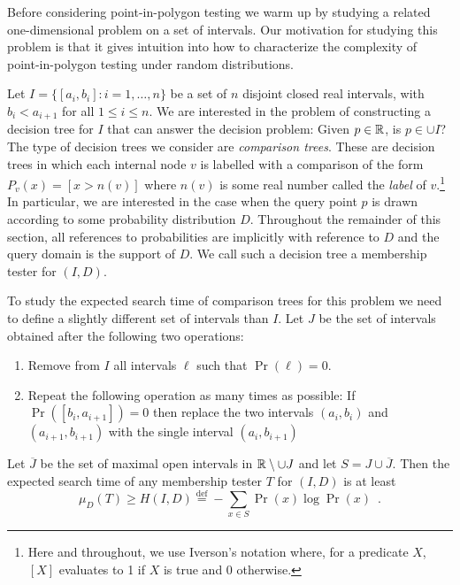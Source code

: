 \documentclass[charterfonts,lotsofwhite]{patmorin}
\newcommand{\defequals}{\stackrel{\mathrm{def}}{=}}
\begin{document}
Before considering point-in-polygon testing we warm up by studying a
related one-dimensional problem on a set of intervals.  Our motivation
for studying this problem is that it gives intuition into how to
characterize the complexity of point-in-polygon testing under random
distributions.

Let $I=\{[a_i,b_i]: i=1,\ldots,n\}$ be a set of $n$ disjoint closed
real intervals, with $b_i < a_{i+1}$ for all $1\le i\le n$.  We are
interested in the problem of constructing a decision tree for $I$ that
can answer the decision problem: Given $p\in\mathbb{R}$, is $p\in \cup I$?
The type of decision trees we consider are \emph{comparison trees}.
These are decision trees in which each internal node $v$ is labelled
with a comparison of the form $P_v(x) = [x > n(v)]$ where $n(v)$ is
some real number called the \emph{label} of $v$.\footnote{Here and
throughout, we use Iverson's notation \cite{kXX} where, for a
predicate $X$, $[X]$ evaluates to 1 if $X$ is true and 0 otherwise.}
In particular, we are interested in the case when the query point $p$
is drawn according to some probability distribution $D$.   Throughout
the remainder of this section, all references to probabilities are
implicitly with reference to $D$ and the query domain is the support
of $D$.  We call such a decision tree a membership tester for $(I,D)$.

To study the expected search time of comparison trees for this problem
we need to define a slightly different set of intervals than $I$.  Let
$J$ be the set of intervals obtained after the following two
operations:

\begin{enumerate}

\item Remove from $I$ all intervals $\ell$ such that $\Pr(\ell) = 0$.

\item Repeat the following operation as many times as possible:  If
$\Pr([b_i,a_{i+1}])=0$ then replace the two intervals $(a_i,b_i)$ and
$(a_{i+1},b_{i+1})$ with the single interval $(a_i,b_{i+1})$
\end{enumerate}

\begin{lem}
Let $\overline{J}$ be the set of maximal open intervals in
$\mathbb{R}\setminus\cup J$ and let $S=J\cup \overline{J}$.  Then the
expected search time of any membership tester $T$ for $(I,D)$ is at least
\[
    \mu_D(T) \ge H(I,D) \defequals 
	-\sum_{x\in S} \Pr(x)\log \Pr(x) \enspace .
\]
\end{lem}
\end{document}
